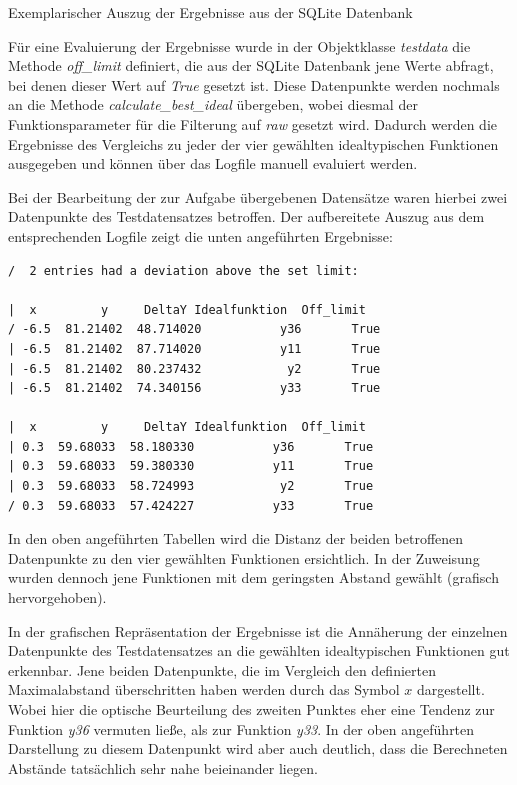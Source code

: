 \begin{table}[H]
\small
\centering
{}
\caption{Exemplarischer Auszug der Ergebnisse aus der SQLite Datenbank}
\label{tab:sqlitetest.csv}
\end{table} 

Für eine Evaluierung der Ergebnisse wurde in der Objektklasse \emph{testdata} die Methode \emph{off\_limit} definiert, die aus der SQLite Datenbank jene Werte abfragt, bei denen dieser Wert auf \emph{True} gesetzt ist. Diese Datenpunkte werden nochmals an die Methode \emph{calculate\_best\_ideal} übergeben, wobei diesmal der Funktionsparameter für die Filterung auf \emph{raw} gesetzt wird. Dadurch werden die Ergebnisse des Vergleichs zu jeder der vier gewählten idealtypischen Funktionen ausgegeben und können über das Logfile manuell evaluiert werden.

Bei der Bearbeitung der zur Aufgabe übergebenen Datensätze waren hierbei zwei Datenpunkte des Testdatensatzes betroffen. Der aufbereitete Auszug aus dem entsprechenden Logfile zeigt die unten angeführten Ergebnisse:

\begin{lstlisting}[caption={Datenpunkte mit überschrittenem Maximalabstand},
				   label=offlimit]
/  2 entries had a deviation above the set limit:

|  x         y     DeltaY Idealfunktion  Off_limit
/ -6.5  81.21402  48.714020           y36       True
| -6.5  81.21402  87.714020           y11       True
| -6.5  81.21402  80.237432            y2       True
| -6.5  81.21402  74.340156           y33       True

|  x         y     DeltaY Idealfunktion  Off_limit
| 0.3  59.68033  58.180330           y36       True
| 0.3  59.68033  59.380330           y11       True
| 0.3  59.68033  58.724993            y2       True
/ 0.3  59.68033  57.424227           y33       True
\end{lstlisting}

In den oben angeführten Tabellen wird die Distanz der beiden betroffenen Datenpunkte zu den vier gewählten Funktionen ersichtlich. In der Zuweisung wurden dennoch jene Funktionen mit dem geringsten Abstand gewählt (grafisch hervorgehoben).

In der grafischen Repräsentation der Ergebnisse ist die Annäherung der einzelnen Datenpunkte des Testdatensatzes an die gewählten idealtypischen Funktionen gut erkennbar. Jene beiden Datenpunkte, die im Vergleich den definierten Maximalabstand überschritten haben werden durch das Symbol $x$ dargestellt. Wobei hier die optische Beurteilung des zweiten Punktes eher eine Tendenz zur Funktion \emph{y36} vermuten ließe, als zur Funktion \emph{y33}. In der oben angeführten Darstellung zu diesem Datenpunkt wird aber auch deutlich, dass die Berechneten Abstände tatsächlich sehr nahe beieinander liegen.

